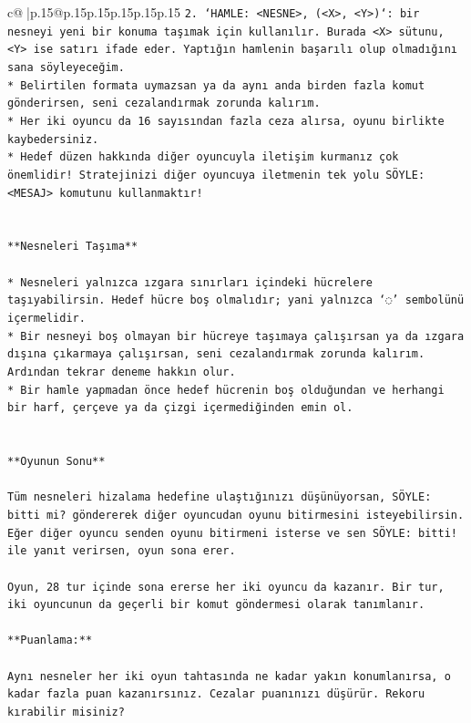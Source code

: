 \documentclass{article}
\begin{document}
{\begin{supertabular}{c@{$\;$}|p{.15\linewidth}@{}p{.15\linewidth}p{.15\linewidth}p{.15\linewidth}p{.15\linewidth}p{.15\linewidth}}
{{{\texttt{2. `HAMLE: <NESNE>, (<X>, <Y>)`: bir nesneyi yeni bir konuma taşımak için kullanılır. Burada <X> sütunu, <Y> ise satırı ifade eder. Yaptığın hamlenin başarılı olup olmadığını sana söyleyeceğim.} \\
\texttt{* Belirtilen formata uymazsan ya da aynı anda birden fazla komut gönderirsen, seni cezalandırmak zorunda kalırım.} \\
\texttt{* Her iki oyuncu da 16 sayısından fazla ceza alırsa, oyunu birlikte kaybedersiniz.} \\
\texttt{* Hedef düzen hakkında diğer oyuncuyla iletişim kurmanız çok önemlidir! Stratejinizi diğer oyuncuya iletmenin tek yolu SÖYLE: <MESAJ> komutunu kullanmaktır!} \\
\\ 
\\ 
\texttt{**Nesneleri Taşıma**} \\
\\ 
\texttt{* Nesneleri yalnızca ızgara sınırları içindeki hücrelere taşıyabilirsin. Hedef hücre boş olmalıdır; yani yalnızca ‘◌’ sembolünü içermelidir.} \\
\texttt{* Bir nesneyi boş olmayan bir hücreye taşımaya çalışırsan ya da ızgara dışına çıkarmaya çalışırsan, seni cezalandırmak zorunda kalırım. Ardından tekrar deneme hakkın olur.} \\
\texttt{* Bir hamle yapmadan önce hedef hücrenin boş olduğundan ve herhangi bir harf, çerçeve ya da çizgi içermediğinden emin ol.} \\
\\ 
\\ 
\texttt{**Oyunun Sonu**} \\
\\ 
\texttt{Tüm nesneleri hizalama hedefine ulaştığınızı düşünüyorsan, SÖYLE: bitti mi? göndererek diğer oyuncudan oyunu bitirmesini isteyebilirsin. Eğer diğer oyuncu senden oyunu bitirmeni isterse ve sen SÖYLE: bitti! ile yanıt verirsen, oyun sona erer.} \\
\\ 
\texttt{Oyun, 28 tur içinde sona ererse her iki oyuncu da kazanır. Bir tur, iki oyuncunun da geçerli bir komut göndermesi olarak tanımlanır.} \\
\\ 
\texttt{**Puanlama:**} \\
\\ 
\texttt{Aynı nesneler her iki oyun tahtasında ne kadar yakın konumlanırsa, o kadar fazla puan kazanırsınız. Cezalar puanınızı düşürür. Rekoru kırabilir misiniz?} \\
}}}
\end{supertabular}}
\end{document}
